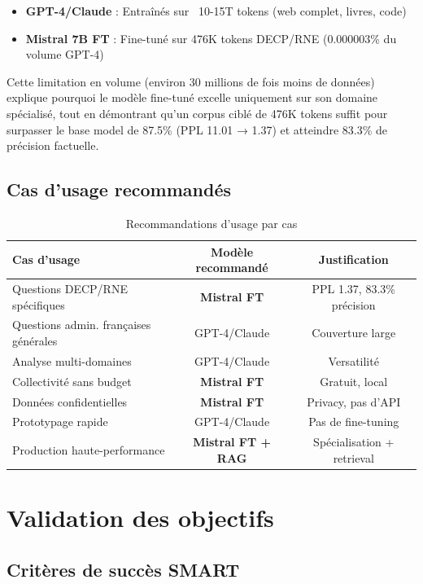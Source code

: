 \begin{itemize}
    \item \textbf{GPT-4/Claude} : Entraînés sur ~10-15T tokens (web complet, livres, code)
    \item \textbf{Mistral 7B FT} : Fine-tuné sur 476K tokens DECP/RNE (0.000003\% du volume GPT-4)
\end{itemize}

Cette limitation en volume (environ 30 millions de fois moins de données) explique pourquoi le modèle fine-tuné excelle uniquement sur son domaine spécialisé, tout en démontrant qu'un corpus ciblé de 476K tokens suffit pour surpasser le base model de 87.5\% (PPL 11.01 → 1.37) et atteindre 83.3\% de précision factuelle.

\subsection{Cas d'usage recommandés}

\begin{table}[h]
\centering
\caption{Recommandations d'usage par cas}
\label{tab:use_case_recommendations}
\small
\begin{tabular}{@{}lcc@{}}
\toprule
\textbf{Cas d'usage} & \textbf{Modèle recommandé} & \textbf{Justification} \\ \midrule
Questions DECP/RNE spécifiques & \textbf{Mistral FT} & PPL 1.37, 83.3\% précision \\
Questions admin. françaises générales & GPT-4/Claude & Couverture large \\
Analyse multi-domaines & GPT-4/Claude & Versatilité \\
Collectivité sans budget & \textbf{Mistral FT} & Gratuit, local \\
Données confidentielles & \textbf{Mistral FT} & Privacy, pas d'API \\
Prototypage rapide & GPT-4/Claude & Pas de fine-tuning \\
Production haute-performance & \textbf{Mistral FT + RAG} & Spécialisation + retrieval \\
\bottomrule
\end{tabular}
\end{table}

\section{Validation des objectifs}

\subsection{Critères de succès SMART}

